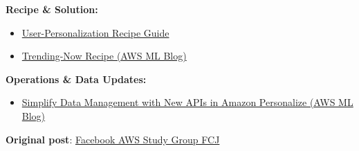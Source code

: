 \vspace{0.5em}\noindent\textbf{Recipe \& Solution:}\par

\begin{itemize}
\tightlist
\item
  \href{https://docs.aws.amazon.com/personalize/latest/dg/native-recipe-new-item-USER_PERSONALIZATION.html}{User-Personalization
  Recipe Guide}
\item
  \href{https://aws.amazon.com/blogs/machine-learning/recommend-top-trending-items-to-your-users-using-the-new-amazon-personalize-recipe/}{Trending-Now
  Recipe (AWS ML Blog)}
\end{itemize}

\vspace{0.5em}\noindent\textbf{Operations \& Data Updates:}\par

\begin{itemize}
\tightlist
\item
  \href{https://aws.amazon.com/blogs/machine-learning/simplify-data-management-with-new-apis-in-amazon-personalize}{Simplify
  Data Management with New APIs in Amazon Personalize (AWS ML Blog)}
\end{itemize}

\textbf{Original post}:
\href{https://www.facebook.com/groups/awsstudygroupfcj/permalink/2229289067836053/?rdid=PGigWM6loaBLr4ZG\#}{Facebook
AWS Study Group FCJ}
